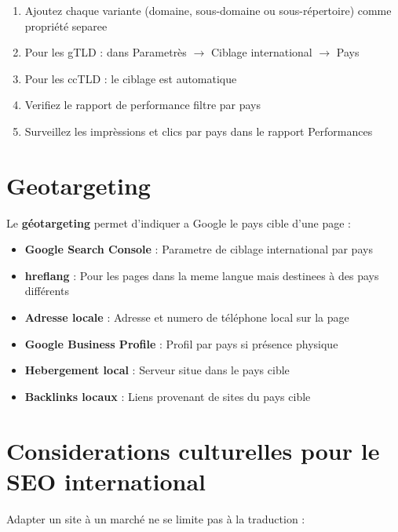 \documentclass[12pt,a4paper,twoside]{report}
\newcommand{\keyword}[1]{\textbf{\textcolor{googleblue}{#1}}}
\begin{document}
\begin{enumerate}
    \item Ajoutez chaque variante (domaine, sous-domaine ou sous-répertoire) comme propriété separee
    \item Pour les gTLD : dans Parametrès $\rightarrow$ Ciblage international $\rightarrow$ Pays
    \item Pour les ccTLD : le ciblage est automatique
    \item Verifiez le rapport de performance filtre par pays
    \item Surveillez les imprèssions et clics par pays dans le rapport Performances
\end{enumerate}

\section{Geotargeting}

Le \keyword{géotargeting} permet d'indiquer a Google le pays cible d'une page :

\begin{itemize}
    \item \textbf{Google Search Console} : Parametre de ciblage international par pays
    \item \textbf{hreflang} : Pour les pages dans la meme langue mais destinees à des pays différents
    \item \textbf{Adresse locale} : Adresse et numero de téléphone local sur la page
    \item \textbf{Google Business Profile} : Profil par pays si présence physique
    \item \textbf{Hebergement local} : Serveur situe dans le pays cible
    \item \textbf{Backlinks locaux} : Liens provenant de sites du pays cible
\end{itemize}

\section{Considerations culturelles pour le SEO international}

Adapter un site à un marché ne se limite pas à la traduction :
\end{document}
